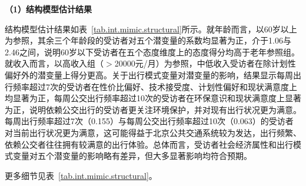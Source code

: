 \textbf{（1）结构模型估计结果}

结构模型估计结果如表~\ref{tab.int.mimic.structural}所示。就年龄而言，以60岁以上为参照，其余三个年龄段的受访者对五个潜变量的系数均显著为正，介于1.06与2.46之间，说明60岁以下受访者在五个态度维度上的态度得分均高于老年参照组。就收入而言，以高收入组（$>$20000元/月）为参照，中低收入受访者在除计划性偏好外的潜变量上得分更高。关于出行模式变量对潜变量的影响，结果显示每周出行频率超过7次的受访者在性价比偏好、技术接受度、计划性偏好和现状满意度上均显著为正，每周公交出行频率超过10次的受访者在环保意识和现状满意度上显著为正，说明依赖公交出行的受访者更关注环境保护，并对现有出行状况更为满意。每周出行频率超过7次（0.155）与每周公交出行频率超过10次（0.063）的受访者对当前出行状况更为满意，这可能得益于北京公共交通系统较为发达，出行频繁、依赖公交者往往拥有较满意的出行体验。总体而言，受访者社会经济属性和出行模式变量对五个潜变量的影响略有差异，但大多显著影响均符合预期。

更多细节见表~\ref{tab.int.mimic.structural}。

